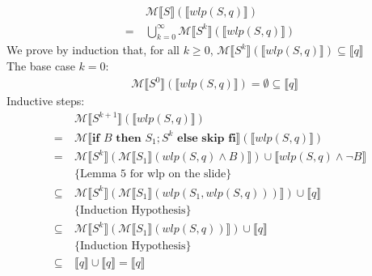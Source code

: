 \documentclass[11pt]{article}
\begin{document}
\begin{enumerate}
\begin{enumerate}
\begin{itemize}
\begin{align*}
						&\mathcal{M}\llbracket S\rrbracket(\llbracket wlp(S, q)\rrbracket)\\
						=~ & \bigcup_{k=0}^{\infty}\mathcal{M}\llbracket S^{k} \rrbracket (\llbracket wlp(S,q) \rrbracket)
					\end{align*}
						We prove by induction that, for all $k \geq 0$, $\mathcal{M}\llbracket S^{k} \rrbracket (\llbracket wlp(S,q) \rrbracket) \subseteq \llbracket q \rrbracket$\\
						The base case $k=0$:
					\begin{align*}
						&\mathcal{M}\llbracket S^{0}\rrbracket(\llbracket wlp(S,q) \rrbracket) = \emptyset \subseteq \llbracket q \rrbracket
					\end{align*}
						Inductive steps:
					\begin{align*}
						&\mathcal{M}\llbracket S^{k+1}\rrbracket(\llbracket wlp(S,q) \rrbracket)\\
						=~ & \mathcal{M}\llbracket \textbf{if } B \textbf{ then } S_{1}; S^{k} \textbf{ else skip fi}\rrbracket(\llbracket wlp(S,q) \rrbracket)\\
						=~ & \mathcal{M}\llbracket S^{k} \rrbracket (\mathcal{M}\llbracket S_{1} \rrbracket (wlp(S, q) \land B) \rrbracket) \cup \llbracket wlp(S,q) \land \neg B \rrbracket\\
						&\{\text{Lemma 5 for wlp on the slide}\}\\
						\subseteq~ & \mathcal{M}\llbracket S^{k} \rrbracket (\mathcal{M}\llbracket S_{1} \rrbracket (wlp(S_{1}, wlp(S, q))) \rrbracket) \cup \llbracket q \rrbracket\\
						&\{\text{Induction Hypothesis}\}\\
						\subseteq~ & \mathcal{M}\llbracket S^{k} \rrbracket (\mathcal{M}\llbracket S_{1} \rrbracket (wlp(S, q)) \rrbracket) \cup \llbracket q \rrbracket\\
						&\{\text{Induction Hypothesis}\}\\
						\subseteq~ & \llbracket q \rrbracket \cup \llbracket q \rrbracket = \llbracket q \rrbracket
					\end{align*}
			\end{itemize}
		\end{enumerate}


\end{enumerate}
\end{document}

